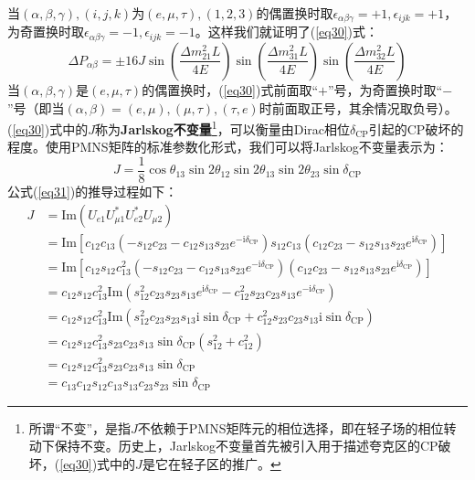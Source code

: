 \documentclass{article}
\newcommand{\ii}{\mathrm{i}}
\begin{document}
	当$(\alpha,\beta,\gamma),(i,j,k)$为$(e,\mu,\tau),(1,2,3)$的偶置换时取$\epsilon_{\alpha\beta\gamma}=+1,\epsilon_{ijk}=+1$，为奇置换时取$\epsilon_{\alpha\beta\gamma}=-1,\epsilon_{ijk}=-1$。这样我们就证明了(\ref{eq30})式：
	\begin{equation*}
		\Delta P_{\alpha\beta}=\pm 16J\sin\left(\frac{\Delta m_{21}^2L}{4E}\right)\sin\left(\frac{\Delta m_{31}^2L}{4E}\right)\sin\left(\frac{\Delta m_{32}^2L}{4E}\right)
	\end{equation*}
	当$(\alpha,\beta,\gamma)$是$(e,\mu,\tau)$的偶置换时，(\ref{eq30})式前面取“$+$”号，为奇置换时取“$-$”号（即当$(\alpha,\beta)=(e,\mu),(\mu,\tau),(\tau,e)$时前面取正号，其余情况取负号）。(\ref{eq30})式中的$J$称为\textbf{Jarlskog不变量}\footnote{所谓“不变”，是指$J$不依赖于PMNS矩阵元的相位选择，即在轻子场的相位转动下保持不变。历史上，Jarlskog不变量首先被引入用于描述夸克区的CP破坏\cite{jarlskog1985basis}，(\ref{eq30})式中的$J$是它在轻子区的推广。}，可以衡量由Dirac相位$\delta_\mathrm{CP}$引起的CP破坏的程度。使用PMNS矩阵的标准参数化形式，我们可以将Jarlskog不变量表示为：
	\begin{equation}
		J=\frac{1}{8} \cos\theta_{13}\sin2\theta_{12}\sin2\theta_{13}\sin2\theta_{23}\sin\delta_{\mathrm{CP}}
		\label{eq31}
	\end{equation}
	公式(\ref{eq31})的推导过程如下：
	\begin{equation*}
		\begin{aligned}
			J&=\mathrm{Im}(U_{e1}U_{\mu1}^*U_{e2}^*U_{\mu2})\\
			&=\mathrm{Im}\left[c_{12}c_{13}(-s_{12}c_{23}-c_{12}s_{13}s_{23}e^{-\ii\delta_{\mathrm{CP}}})s_{12}c_{13}(c_{12}c_{23}-s_{12}s_{13}s_{23}e^{\ii\delta_{\mathrm{CP}}})\right]\\
			&=\mathrm{Im}\left[c_{12}s_{12}c_{13}^2(-s_{12}c_{23}-c_{12}s_{13}s_{23}e^{-\ii\delta_{\mathrm{CP}}})(c_{12}c_{23}-s_{12}s_{13}s_{23}e^{\ii\delta_{\mathrm{CP}}})\right]\\
			&=c_{12}s_{12}c_{13}^2\mathrm{Im}(s_{12}^2c_{23}s_{23}s_{13}e^{\ii\delta_\mathrm{CP}}-c_{12}^2s_{23}c_{23}s_{13}e^{-\ii\delta_\mathrm{CP}})\\
			&=c_{12}s_{12}c_{13}^2\mathrm{Im}(s_{12}^2c_{23}s_{23}s_{13}\ii\sin\delta_\mathrm{CP}+c_{12}^2s_{23}c_{23}s_{13}\ii\sin\delta_\mathrm{CP})\\
			&=c_{12}s_{12}c_{13}^2s_{23}c_{23}s_{13}\sin\delta_\mathrm{CP}(s_{12}^2+c_{12}^2)\\
			&=c_{12}s_{12}c_{13}^2s_{23}c_{23}s_{13}\sin\delta_\mathrm{CP}\\
			&=c_{13}c_{12}s_{12}c_{13}s_{13}c_{23}s_{23}\sin\delta_\mathrm{CP}
		\end{aligned}
	\end{equation*}
\end{document}
